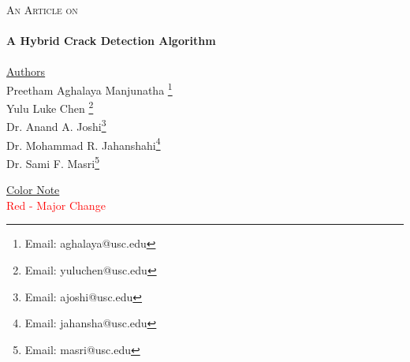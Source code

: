 \begin{titlepage}
\begin{center}
\textsc{\Large An Article on}\\[0.25cm]



\HRule \\[0.4cm]
{ \huge \bfseries A Hybrid Crack Detection Algorithm}\\[0.1cm]
\HRule \\[0.5cm]


\large \underline{Authors}\\
Preetham Aghalaya Manjunatha \footnote{Email: aghalaya@usc.edu}	\\
Yulu Luke Chen \footnote{Email: yuluchen@usc.edu}	\\
Dr. Anand A. Joshi\footnote{Email: ajoshi@usc.edu}				\\
Dr. Mohammad R. Jahanshahi\footnote{Email: jahansha@usc.edu}    \\
Dr. Sami F. Masri\footnote{Email: masri@usc.edu}

\vspace{0.5in}
\large \underline{Color Note}\\
\textcolor{red}{Red        - Major Change} \\


\end{center}
\end{titlepage}


